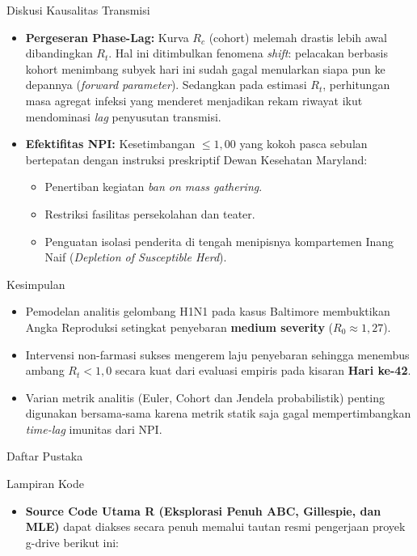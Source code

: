 \documentclass[aspectratio=169]{beamer}
\begin{document}
\begin{frame}{Diskusi Kausalitas Transmisi}
    \begin{itemize}
        \item \textbf{Pergeseran Phase-Lag:} Kurva $R_c$ (cohort) melemah drastis lebih awal dibandingkan $R_t$. Hal ini ditimbulkan fenomena \textit{shift}: pelacakan berbasis kohort menimbang subyek hari ini sudah gagal menularkan siapa pun ke depannya (\textit{forward parameter}). Sedangkan pada estimasi $R_t$, perhitungan masa agregat infeksi yang menderet menjadikan rekam riwayat ikut mendominasi \textit{lag} penyusutan transmisi.
        \item \textbf{Efektifitas NPI:} Kesetimbangan $\leq 1,00$ yang kokoh pasca sebulan bertepatan dengan instruksi preskriptif Dewan Kesehatan Maryland:
        \begin{itemize}
            \item Penertiban kegiatan \textit{ban on mass gathering}.
            \item Restriksi fasilitas persekolahan dan teater.
            \item Penguatan isolasi penderita di tengah menipisnya kompartemen Inang Naif (\textit{Depletion of Susceptible Herd}).
        \end{itemize}
    \end{itemize}
\end{frame}

\begin{frame}{Kesimpulan}
    \begin{itemize}
        \item Pemodelan analitis gelombang H1N1 pada kasus Baltimore membuktikan Angka Reproduksi setingkat penyebaran \textbf{medium severity} ($R_0 \approx 1,27$).
        \item Intervensi non-farmasi sukses mengerem laju penyebaran sehingga menembus ambang $R_t < 1,0$ secara kuat dari evaluasi empiris pada kisaran \textbf{Hari ke-42}.
        \item Varian metrik analitis (Euler, Cohort dan Jendela probabilistik) penting digunakan bersama-sama karena metrik statik saja gagal mempertimbangkan \textit{time-lag} imunitas dari NPI.
    \end{itemize}
\end{frame}

\begin{frame}[allowframebreaks]{Daftar Pustaka}
    \printbibliography
\end{frame}

\begin{frame}{Lampiran Kode}
    \begin{itemize}
        \item \textbf{Source Code Utama R (Eksplorasi Penuh ABC, Gillespie, dan MLE)} dapat diakses secara penuh memalui tautan resmi pengerjaan proyek g-drive berikut ini:\\
        \vspace{0.5cm}
        \href{https://drive.google.com/drive/folders/1DqDRFNOHEabSOpNSRC6R-MKyvHeqKuEu?usp=sharing}{}
    \end{itemize}
\end{frame}
\end{document}
